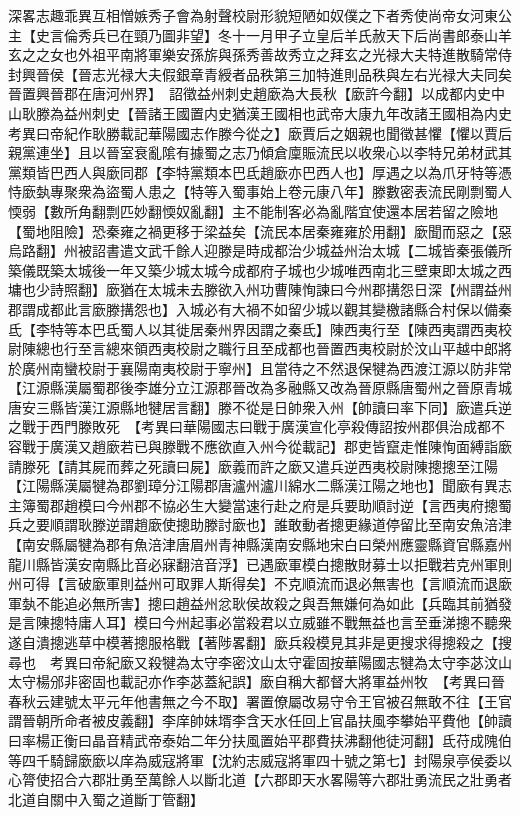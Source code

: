 深畧志趣乖異互相憎嫉秀子會為射聲校尉形貌短陋如奴僕之下者秀使尚帝女河東公主【史言倫秀兵已在頸乃圖非望】冬十一月甲子立皇后羊氏赦天下后尚書郎泰山羊玄之之女也外祖平南將軍樂安孫旂與孫秀善故秀立之拜玄之光禄大夫特進散騎常侍封興晉侯【晉志光禄大夫假銀章青綬者品秩第三加特進則品秩與左右光禄大夫同矣晉置興晉郡在唐河州界】　詔徵益州刺史趙廞為大長秋【廞許今翻】以成都内史中山耿滕為益州刺史【晉諸王國置内史猶漢王國相也武帝大康九年改諸王國相為内史　考異曰帝紀作耿勝載記華陽國志作滕今從之】廞賈后之姻親也聞徵甚懼【懼以賈后親黨連坐】且以晉室衰亂隂有據蜀之志乃傾倉廩賑流民以收衆心以李特兄弟材武其黨類皆巴西人與廞同郡【李特黨類本巴氐趙廞亦巴西人也】厚遇之以為爪牙特等憑恃廞埶專聚衆為盜蜀人患之【特等入蜀事始上卷元康八年】滕數密表流民剛剽蜀人愞弱【數所角翻剽匹妙翻愞奴亂翻】主不能制客必為亂階宜使還本居若留之險地【蜀地阻險】恐秦雍之禍更移于梁益矣【流民本居秦雍雍於用翻】廞聞而惡之【惡烏路翻】州被詔書遣文武千餘人迎滕是時成都治少城益州治太城【二城皆秦張儀所築儀既築太城後一年又築少城太城今成都府子城也少城唯西南北三壁東即太城之西墉也少詩照翻】廞猶在太城未去滕欲入州功曹陳恂諫曰今州郡搆怨日深【州謂益州郡謂成都此言廞滕搆怨也】入城必有大禍不如留少城以觀其變檄諸縣合村保以備秦氐【李特等本巴氐蜀人以其徙居秦州界因謂之秦氐】陳西夷行至【陳西夷謂西夷校尉陳總也行至言總來領西夷校尉之職行且至成都也晉置西夷校尉於汶山平越中郎將於廣州南蠻校尉于襄陽南夷校尉于寧州】且當待之不然退保犍為西渡江源以防非常【江源縣漢屬蜀郡後李雄分立江源郡晉改為多融縣又改為晉原縣唐蜀州之晉原青城唐安三縣皆漢江源縣地犍居言翻】滕不從是日帥衆入州【帥讀曰率下同】廞遣兵逆之戰于西門滕敗死　【考異曰華陽國志曰戰于廣漢宣化亭殺傳詔按州郡俱治成都不容戰于廣漢又趙廞若已與滕戰不應欲直入州今從載記】郡吏皆竄走惟陳恂面縛詣廞請滕死【請其屍而葬之死讀曰屍】廞義而許之廞又遣兵逆西夷校尉陳摠摠至江陽【江陽縣漢屬犍為郡劉璋分江陽郡唐瀘州瀘川綿水二縣漢江陽之地也】聞廞有異志主簿蜀郡趙模曰今州郡不協必生大變當速行赴之府是兵要助順討逆【言西夷府摠蜀兵之要順謂耿滕逆謂趙廞使摠助滕討廞也】誰敢動者摠更緣道停留比至南安魚涪津【南安縣屬犍為郡有魚涪津唐眉州青神縣漢南安縣地宋白曰榮州應靈縣資官縣嘉州龍川縣皆漢安南縣比音必寐翻涪音浮】已遇廞軍模白摠散財募士以拒戰若克州軍則州可得【言破廞軍則益州可取罪人斯得矣】不克順流而退必無害也【言順流而退廞軍埶不能追必無所害】摠曰趙益州忿耿侯故殺之與吾無嫌何為如此【兵臨其前猶發是言陳摠特庸人耳】模曰今州起事必當殺君以立威雖不戰無益也言至垂涕摠不聽衆遂自潰摠逃草中模著摠服格戰【著陟畧翻】廞兵殺模見其非是更搜求得摠殺之【搜尋也　考異曰帝紀廞又殺犍為太守李密汶山太守霍固按華陽國志犍為太守李苾汶山太守楊邠非密固也載記亦作李苾蓋紀誤】廞自稱大都督大將軍益州牧　【考異曰晉春秋云建號太平元年他書無之今不取】署置僚屬改易守令王官被召無敢不往【王官謂晉朝所命者被皮義翻】李庠帥妹壻李含天水任回上官晶扶風李攀始平費他【帥讀曰率楊正衡曰晶音精武帝泰始二年分扶風置始平郡費扶沸翻他徒河翻】氐苻成隗伯等四千騎歸廞廞以庠為威寇將軍【沈約志威寇將軍四十號之第七】封陽泉亭侯委以心膂使招合六郡壯勇至萬餘人以斷北道【六郡即天水畧陽等六郡壯勇流民之壯勇者北道自關中入蜀之道斷丁管翻】

